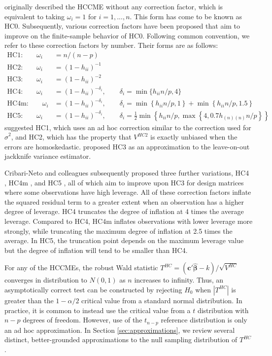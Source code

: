 \documentclass[12pt]{article}\usepackage[]{graphicx}\usepackage[]{color}
\newcommand{\bm}{\mathbf}
\newcommand{\bs}{\boldsymbol}
\begin{document}
\citet{White1980heteroskedasticity} originally described the HCCME without any correction factor, which is equivalent to taking $\omega_i = 1$ for $i = 1,...,n$. 
This form has come to be known as HC0. 
Subsequently, various correction factors have been proposed that aim to improve on the finite-sample behavior of HC0. 
Following common convention, we refer to these correction factors by number.
Their forms are as follows:
\begin{align*}
\text{HC1:} \qquad \omega_i &= n / (n - p) \\
\text{HC2:} \qquad \omega_i &= (1 - h_{ii})^{-1} \\
\text{HC3:} \qquad \omega_i &= (1 - h_{ii})^{-2} \\
\text{HC4:} \qquad \omega_i &= (1 - h_{ii})^{-\delta_i}, \qquad \delta_i = \min\{h_{ii} n / p, 4\} \\
\text{HC4m:} \qquad \omega_i &= (1 - h_{ii})^{-\delta_i}, \qquad \delta_i = \min\left\{h_{ii} n / p, 1 \right\} + \min\left\{h_{ii} n / p, 1.5 \right\} \\
\text{HC5:} \qquad \omega_i &= (1 - h_{ii})^{-\delta_i}, \qquad \delta_i = \frac{1}{2}\min\left\{h_{ii} n / p, \max \left\{4, 0.7 h_{(n)(n)} n / p\right\}\right\}
\end{align*}
\citet{MacKinnon1985some} suggested HC1, which uses an ad hoc correction similar to the correction used for $\hat\sigma^2$, and HC2, which has the property that $V^{HC2}$ is exactly unbiased when the errors are homoskedastic. 
\citet{Davidson1993estimation} proposed HC3 as an approximation to the leave-on-out jackknife variance estimator. 

Cribari-Neto and colleagues subsequently proposed three further variations, HC4 \citep{Cribari-Neto2004asymptotic}, HC4m \citep{Cribari-Neto2011new}, and HC5 \citep{Cribari-Neto2007inference}, all of which aim to improve upon HC3 for design matrices where some observations have high leverage. 
All of these correction factors inflate the squared residual term to a greater extent when an observation has a higher degree of leverage. 
HC4 truncates the degree of inflation at 4 times the average leverage. 
Compared to HC4, HC4m inflates observations with lower leverage more strongly, while truncating the maximum degree of inflation at 2.5 times the average. 
In HC5, the truncation point depends on the maximum leverage value but the degree of inflation will tend to be smaller than HC4. 

For any of the HCCMEs, the robust Wald statistic $T^{HC} = \left(\bm{c}'\bs{\hat\beta} - k\right) / \sqrt{V^{HC}}$ converges in distribution to $N(0,1)$ as $n$ increases to infinity. 
Thus, an asymptotically correct test can be constructed by rejecting $H_0$ when $\left|T^{HC}\right|$ is greater than the $1 - \alpha / 2$ critical value from a standard normal distribution. 
In practice, it is common to instead use the critical value from a $t$ distribution with $n - p$ degrees of freedom. 
However, use of the $t_{n-p}$ reference distribution is only an ad hoc approximation. In Section \ref{sec:approximations}, we review several distinct, better-grounded approximations to the null sampling distribution of $T^{HC}$. 
\end{document}
